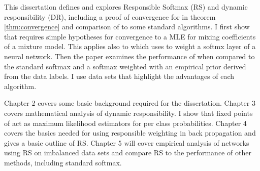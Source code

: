 This dissertation defines and explores Responsible Softmax (RS) and dynamic responsibility (DR), including a proof of convergence for \DR in theorem \ref{thm:convergence} and comparison of \RS to some standard algorithms.  I first show that \DR requires simple hypotheses for convergence to a MLE for mixing coefficients of a mixture model. This applies also to \RS which uses \DR to weight a softmx layer of a neural network.  Then the paper examines the performance of \RS when compared to the standard softmax and a softmax weighted with an empirical prior derived from the data labels.  I use data sets that highlight the advantages of each algorithm.

Chapter 2 covers some basic background required for the dissertation.  Chapter 3 covers mathematical analysis of dynamic responsibility. I show that fixed points of \DR act as maximum likelihood estimators for per class probabilities. Chapter 4 covers the basics needed for using responsible weighting in back propagation and gives a basic outline of RS\null. Chapter 5 will cover empirical analysis of networks using RS on imbalanced data sets and compare RS to the performance of other methods, including standard softmax.